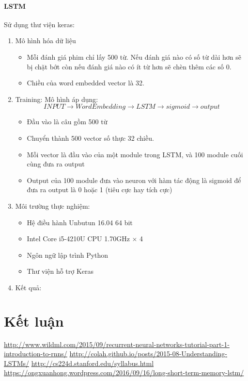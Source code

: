 \documentclass[a4paper,12pt]{report}
\begin{document}
\subsubsection{LSTM}
Sử dụng thư viện keras:
\begin{enumerate}
\item Mô hình hóa dữ liệu
\begin{itemize}
\item Mỗi đánh giá phim chỉ lấy 500 từ. Nếu đánh giá nào có số từ dài hơn sẽ bị chặt bớt còn nếu đánh giá nào có ít từ hơn sẽ chèn thêm các số 0.
\item Chiều của word embedded vector là 32.
\end{itemize}
\item Training: Mô hình áp dụng:
$$ INPUT \rightarrow WordEmbedding \rightarrow LSTM \rightarrow sigmoid \rightarrow output$$
\begin{itemize}
\item Đầu vào là câu gồm 500 từ
\item Chuyển thành 500 vector số thực 32 chiều.
\item Mỗi vector là đầu vào của một module trong LSTM, và 100 module cuối cùng đưa ra output 
\item Output của 100 module đưa vào neuron với hàm tác động là sigmoid để đưa ra output là 0 hoặc 1 (tiêu cực hay tích cực)
\end{itemize}
\item Môi trường thực nghiệm:
\begin{itemize}
\item Hệ điều hành Unbutun 16.04 64 bit
\item Intel Core i5-4210U CPU 1.70GHz $\times$ 4
\item Ngôn ngữ lập trình Python
\item Thư viện hỗ trợ Keras
\end{itemize}
\item Kết quả:
\end{enumerate}

\chapter{Kết luận} 


\begin{thebibliography}{9}
 \url{http://www.wildml.com/2015/09/recurrent-neural-networks-tutorial-part-1-introduction-to-rnns/}
 \url{http://colah.github.io/posts/2015-08-Understanding-LSTMs/}
 \url{http://cs224d.stanford.edu/syllabus.html}
 \url{https://ongxuanhong.wordpress.com/2016/09/16/long-short-term-memory-lstm/}
\end{thebibliography}
\end{document}
